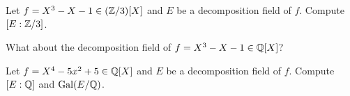\begin{exercise}
    Let $f=X^3-X-1\in (\mathbb{Z}/3)[X]$ and $E$ be a decomposition field of $f$. 
    Compute $[E:\mathbb{Z}/3]$. 
\end{exercise}

What about the decomposition field of $f=X^3-X-1\in \mathbb{Q}[X]$?

\begin{exercise}
\label{xca:dec field X^4-5X^2+5}
    Let $f=X^4-5x^2+5\in \mathbb{Q}[X]$ and $E$ be a decomposition field of $f$. 
    Compute $[E:\mathbb{Q}]$ and $\operatorname{Gal}(E/\mathbb{Q})$. 
\end{exercise}



